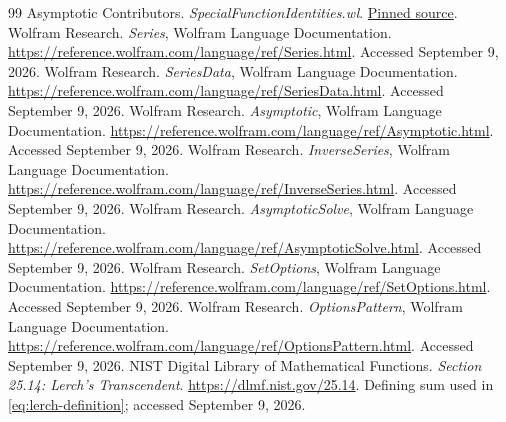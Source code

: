 \documentclass[11pt,a4paper]{article}
\newcommand{\src}[2]{\href{https://github.com/VladimirReshetnikov/Asymptotic/blob/6687962f3c858a4f93623cfc496f33e35c6763d4/#1}{#2}}
\begin{document}
\begin{thebibliography}{99}
 Asymptotic Contributors. \emph{SpecialFunctionIdentities.wl}. \src{src/Kernel/SpecialFunctionIdentities.wl}{Pinned source}.
 Wolfram Research. \emph{Series}, Wolfram Language Documentation. \url{https://reference.wolfram.com/language/ref/Series.html}. Accessed September 9, 2026.
 Wolfram Research. \emph{SeriesData}, Wolfram Language Documentation. \url{https://reference.wolfram.com/language/ref/SeriesData.html}. Accessed September 9, 2026.
 Wolfram Research. \emph{Asymptotic}, Wolfram Language Documentation. \url{https://reference.wolfram.com/language/ref/Asymptotic.html}. Accessed September 9, 2026.
 Wolfram Research. \emph{InverseSeries}, Wolfram Language Documentation. \url{https://reference.wolfram.com/language/ref/InverseSeries.html}. Accessed September 9, 2026.
 Wolfram Research. \emph{AsymptoticSolve}, Wolfram Language Documentation. \url{https://reference.wolfram.com/language/ref/AsymptoticSolve.html}. Accessed September 9, 2026.
 Wolfram Research. \emph{SetOptions}, Wolfram Language Documentation. \url{https://reference.wolfram.com/language/ref/SetOptions.html}. Accessed September 9, 2026.
 Wolfram Research. \emph{OptionsPattern}, Wolfram Language Documentation. \url{https://reference.wolfram.com/language/ref/OptionsPattern.html}. Accessed September 9, 2026.
 NIST Digital Library of Mathematical Functions. \emph{Section 25.14: Lerch's Transcendent}. \url{https://dlmf.nist.gov/25.14}. Defining sum used in \eqref{eq:lerch-definition}; accessed September 9, 2026.
\end{thebibliography}
\end{document}
